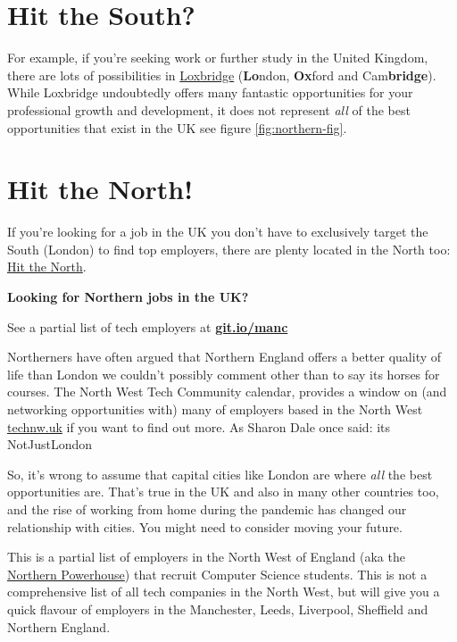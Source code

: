 \documentclass[
]{book}
\begin{document}
\hypertarget{south}{%
\section{Hit the South?}\label{south}}

For example, if you're seeking work or further study in the United Kingdom, there are lots of possibilities in \href{https://en.wikipedia.org/wiki/Loxbridge}{Loxbridge} (\textbf{Lo}ndon, \textbf{Ox}ford and Cam\textbf{bridge}). While Loxbridge undoubtedly offers many fantastic opportunities for your professional growth and development, it does not represent \emph{all} of the best opportunities that exist in the UK see figure \ref{fig:northern-fig}.

\hypertarget{north}{%
\section{Hit the North!}\label{north}}

If you're looking for a job in the UK you don't have to exclusively target the South (London) to find top employers, there are plenty located in the North too: \href{https://en.wikipedia.org/wiki/Hit_the_North}{Hit the North}. \citep{hitthenorth}

\textbf{Looking for Northern jobs in the UK?}

See a partial list of tech employers at \textbf{\href{https://git.io/manc}{git.io/manc}}

Northerners have often argued that Northern England offers a better quality of life than London we couldn't possibly comment other than to say its horses for courses. The North West Tech Community calendar, provides a window on (and networking opportunities with) many of employers based in the North West \href{https://technw.uk}{technw.uk} if you want to find out more. As Sharon Dale once said: its NotJustLondon \citep{notjustlondon}

So, it's wrong to assume that capital cities like London are where \emph{all} the best opportunities are. That's true in the UK and also in many other countries too, and the rise of working from home during the pandemic has changed our relationship with cities. You might need to consider moving your future.

This is a partial list of employers in the North West of England (aka the \href{https://en.wikipedia.org/wiki/Northern_Powerhouse}{Northern Powerhouse}) that recruit Computer Science students. This is not a comprehensive list of all tech companies in the North West, but will give you a quick flavour of employers in the Manchester, Leeds, Liverpool, Sheffield and Northern England.
\end{document}
